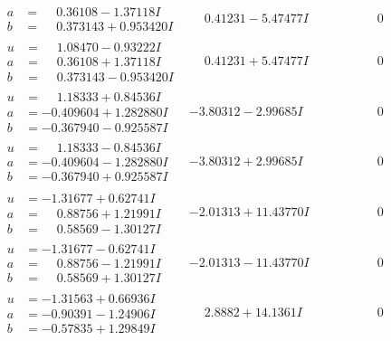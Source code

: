 \documentclass[1p]{elsarticle_modified}
\theoremstyle{definition}
\begin{document}
$$\begin{array}{c|c|c}
\begin{aligned}
a &= \phantom{-}0.36108 - 1.37118 I \\
b &= \phantom{-}0.373143 + 0.953420 I\end{aligned}
 & \phantom{-}0.41231 - 5.47477 I & \phantom{-0.000000 } 0 \\ \hline\begin{aligned}
u &= \phantom{-}1.08470 - 0.93222 I \\
a &= \phantom{-}0.36108 + 1.37118 I \\
b &= \phantom{-}0.373143 - 0.953420 I\end{aligned}
 & \phantom{-}0.41231 + 5.47477 I & \phantom{-0.000000 } 0 \\ \hline\begin{aligned}
u &= \phantom{-}1.18333 + 0.84536 I \\
a &= -0.409604 + 1.282880 I \\
b &= -0.367940 - 0.925587 I\end{aligned}
 & -3.80312 - 2.99685 I & \phantom{-0.000000 } 0 \\ \hline\begin{aligned}
u &= \phantom{-}1.18333 - 0.84536 I \\
a &= -0.409604 - 1.282880 I \\
b &= -0.367940 + 0.925587 I\end{aligned}
 & -3.80312 + 2.99685 I & \phantom{-0.000000 } 0 \\ \hline\begin{aligned}
u &= -1.31677 + 0.62741 I \\
a &= \phantom{-}0.88756 + 1.21991 I \\
b &= \phantom{-}0.58569 - 1.30127 I\end{aligned}
 & -2.01313 + 11.43770 I & \phantom{-0.000000 } 0 \\ \hline\begin{aligned}
u &= -1.31677 - 0.62741 I \\
a &= \phantom{-}0.88756 - 1.21991 I \\
b &= \phantom{-}0.58569 + 1.30127 I\end{aligned}
 & -2.01313 - 11.43770 I & \phantom{-0.000000 } 0 \\ \hline\begin{aligned}
u &= -1.31563 + 0.66936 I \\
a &= -0.90391 - 1.24906 I \\
b &= -0.57835 + 1.29849 I\end{aligned}
 & \phantom{-}2.8882 + 14.1361 I & \phantom{-0.000000 } 0 \\ \hline\begin{aligned}

\end{aligned}
\end{array}$$
\end{document}

